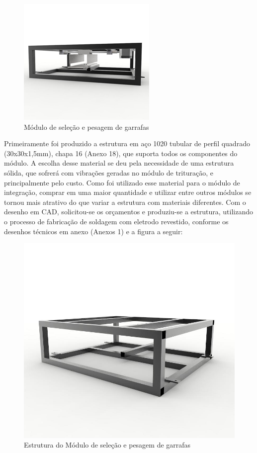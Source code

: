 \begin{figure}[!h]
	\centering
		\includegraphics[scale=0.9]{figuras/estrutura/1-Modulo-de-selecao-e-pesagem-de-garrafas.png}
	\caption{Módulo de seleção e pesagem de garrafas}
\end{figure}

\newpage

Primeiramente foi produzido a estrutura em aço 1020 tubular de perfil quadrado (30x30x1,5mm), chapa 16 (Anexo 18), que suporta todos os componentes do módulo. A escolha desse material se deu pela necessidade de uma estrutura sólida, que sofrerá com vibrações geradas no módulo de trituração, e principalmente pelo custo. Como foi utilizado esse material para o módulo de integração, comprar em uma maior quantidade e utilizar entre outros módulos se tornou mais atrativo do que variar a estrutura com materiais diferentes. Com o desenho em CAD, solicitou-se os orçamentos e produziu-se a estrutura, utilizando o processo de fabricação de soldagem com eletrodo revestido, conforme os desenhos técnicos em anexo (Anexos 1) e a figura a seguir:

\begin{figure}[!h]
	\centering
		\includegraphics[scale=0.4]{figuras/estrutura/2-Estrutura-do-Modulo-de-selecao.jpg}
	\caption{Estrutura  do Módulo de seleção e pesagem de garrafas}
\end{figure}

